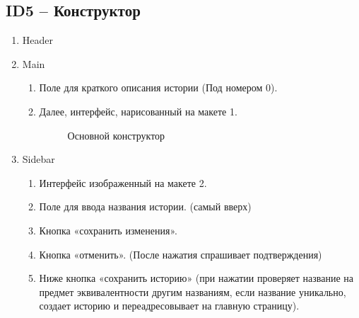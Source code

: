 \documentclass[a4paper]{article}
\begin{document}
		\subsection{ID5 – Конструктор}
			\begin{enumerate}
				\item Header
				\item Main
				\begin{enumerate}
					\item Поле для краткого описания истории (Под номером 0).
					\item Далее, интерфейс, нарисованный на макете 1.
					\begin{figure}[h]
						\caption{Основной конструктор}
					\end{figure}
				\end{enumerate}
				\item Sidebar
				\begin{enumerate}
					\item Интерфейс изображенный на макете 2.
					\item Поле для ввода названия истории. (самый вверх)
					\item Кнопка «сохранить изменения».
					\item Кнопка «отменить». (После нажатия спрашивает подтверждения)
					\item Ниже кнопка «сохранить историю» (при нажатии проверяет название на предмет эквивалентности другим названиям, если название уникально, создает историю и переадресовывает на главную страницу).
					\begin{figure}[h]

\end{figure}
\end{enumerate}
\end{enumerate}
\end{document}
